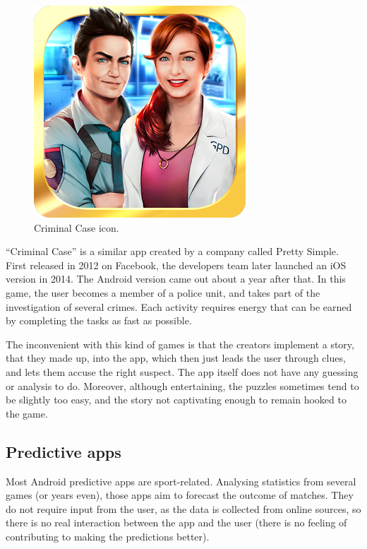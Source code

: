 \documentclass{mproj}
\begin{document}
\begin{figure}
	\vspace{-10pt}
	\centering
	\includegraphics[scale=0.25]{images/criminalcase_icon}
	\caption{Criminal Case icon.}
	\vspace{-30pt}
\end{figure}

``Criminal Case'' \cite{criminalcase} is a similar app created by a company called Pretty Simple. First released in 2012 on Facebook, the developers team later launched an iOS version in 2014. The Android version came out about a year after that. In this game, the user becomes a member of a police unit, and takes part of the investigation of several crimes. Each activity requires energy that can be earned by completing the tasks as fast as possible.\\ \par

The inconvenient with this kind of games is that the creators implement a story, that they made up, into the app, which then just leads the user through clues, and lets them accuse the right suspect. The app itself does not have any guessing or analysis to do.
Moreover, although entertaining, the puzzles sometimes tend to be slightly too easy, and the story not captivating enough to remain hooked to the game.

\subsection{Predictive apps}

Most Android predictive apps are sport-related. Analysing statistics from several games (or years even), those apps aim to forecast the outcome of matches. 
They do not require input from the user, as the data is collected from online sources, so there is no real interaction between the app and the user (there is no feeling of contributing to making the predictions better).
\end{document}
